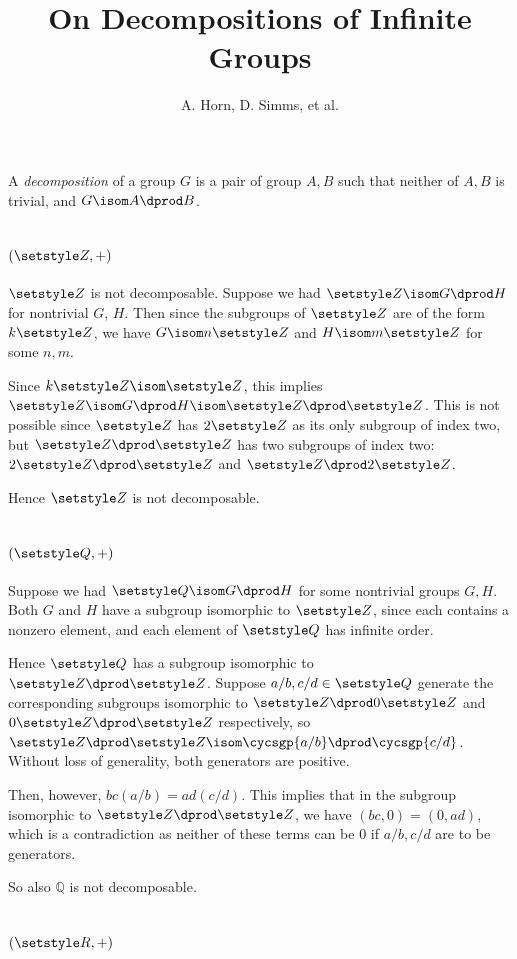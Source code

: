\documentclass[fleqn,a4paper,11pt]{article}
\title{On Decompositions of Infinite Groups}
\author{A. Horn, D. Simms, et al.}
\begin{document}
\maketitle

A \emph{decomposition} of a group \(G\) is a pair of group \(A, B\) such that
neither of \(A, B\) is trivial, and \(G \isom A \dprod B\).

\section{\((\Z, +)\)}

\(\Z\) is not decomposable. Suppose we had \(\Z \isom G \dprod H\) for
nontrivial \(G\), \(H\). Then since the subgroups of \(\Z\) are of the form
\(k\Z\), we have \(G \isom n\Z\) and \(H \isom m\Z\) for some \(n, m\).

Since \(k\Z \isom \Z\), this implies \(\Z \isom G \dprod H \isom \Z \dprod \Z\).
This is not possible since \(\Z\) has \(2\Z\) as its only subgroup of index two,
but \(\Z \dprod \Z\) has two subgroups of index two: \(2\Z \dprod \Z\) and \(\Z
\dprod 2\Z\).

Hence \(\Z\) is not decomposable.

\section{\((\Q, +)\)}

Suppose we had \(\Q \isom G \dprod H\) for some nontrivial groups \(G, H\). Both
\(G\) and \(H\) have a subgroup isomorphic to \(\Z\), since each contains a
nonzero element, and each element of \(\Q\) has infinite order.

Hence \(\Q\) has a subgroup isomorphic to \(\Z \dprod \Z\). Suppose
\(a/b, c/d \in \Q\) generate the corresponding subgroups isomorphic to
\(\Z \dprod 0\Z\) and \(0\Z \dprod \Z\) respectively, so
\(\Z \dprod \Z \isom \cycsgp{a/b} \dprod \cycsgp{c/d}\). Without loss of
generality, both generators are positive.

Then, however, \(bc(a/b) = ad(c/d)\). This implies that in the subgroup
isomorphic to \(\Z \dprod \Z\), we have \((bc, 0) = (0, ad)\), which is a
contradiction as neither of these terms can be \(0\) if \(a/b, c/d\) are to be
generators.

So also \(\mathbb Q\) is not decomposable.

\section{\((\R, +)\)}
\end{document}
